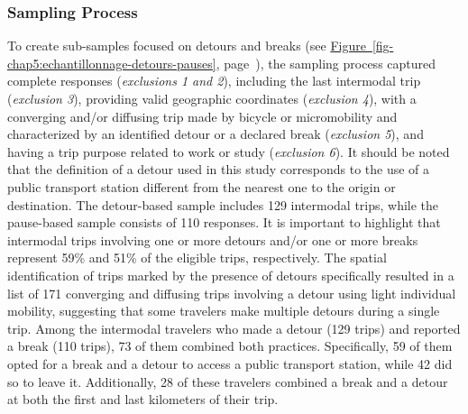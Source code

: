 \begin{refsegment}

\subsubsection*{Sampling Process
    \label{chap5:echantillonnage-detours-pauses}
    }

To create sub-samples focused on detours and breaks (see \hyperref[fig-chap5:echantillonnage-detours-pauses]{Figure~\ref{fig-chap5:echantillonnage-detours-pauses}}, page~\pageref{fig-chap5:echantillonnage-detours-pauses}), the sampling process captured complete responses (\textsl{exclusions 1 and 2}), including the last intermodal trip (\textsl{exclusion 3}), providing valid geographic coordinates (\textsl{exclusion 4}), with a converging and/or diffusing trip made by bicycle or micromobility and characterized by an identified detour or a declared break (\textsl{exclusion 5}), and having a trip purpose related to work or study (\textsl{exclusion 6}). It should be noted that the definition of a detour used in this study corresponds to the use of a public transport station different from the nearest one to the origin or destination. The detour-based sample includes 129 intermodal trips, while the pause-based sample consists of 110 responses. It is important to highlight that intermodal trips involving one or more detours and/or one or more breaks represent 59\% and 51\% of the eligible trips, respectively. The spatial identification of trips marked by the presence of detours specifically resulted in a list of 171 converging and diffusing trips involving a detour using light individual mobility, suggesting that some travelers make multiple detours during a single trip. Among the intermodal travelers who made a detour (129 trips) and reported a break (110 trips), 73 of them combined both practices. Specifically, 59 of them opted for a break and a detour to access a public transport station, while 42 did so to leave it. Additionally, 28 of these travelers combined a break and a detour at both the first and last kilometers of their trip.%


\end{refsegment}

